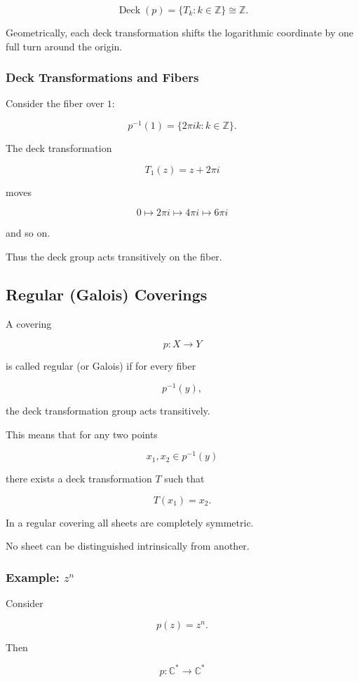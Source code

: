 \documentclass[12pt,a4paper]{article}
\theoremstyle{notespace}
\begin{document}
\[
\operatorname{Deck}(p)
=
\{T_k:k\in\mathbb Z\}
\cong
\mathbb Z.
\]

Geometrically, each deck transformation shifts the logarithmic coordinate by one full turn around the origin.

\subsubsection{Deck Transformations and Fibers}

Consider the fiber over \(1\):

\[
p^{-1}(1)
=
\{2\pi i k:k\in\mathbb Z\}.
\]

The deck transformation

\[
T_1(z)=z+2\pi i
\]

moves

\[
0
\longmapsto
2\pi i
\longmapsto
4\pi i
\longmapsto
6\pi i
\]

and so on.

Thus the deck group acts transitively on the fiber.

\subsection{Regular (Galois) Coverings}

A covering

\[
p:X\to Y
\]

is called regular (or Galois) if for every fiber

\[
p^{-1}(y),
\]

the deck transformation group acts transitively.

This means that for any two points

\[
x_1,x_2\in p^{-1}(y)
\]

there exists a deck transformation \(T\) such that

\[
T(x_1)=x_2.
\]

In a regular covering all sheets are completely symmetric.

No sheet can be distinguished intrinsically from another.

\subsubsection{Example: \(z^n\)}

Consider

\[
p(z)=z^n.
\]

Then

\[
p:\mathbb C^*\to\mathbb C^*
\]
\end{document}
